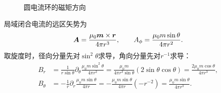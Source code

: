 \begin{figure}[H]\centering
{}
\caption{圆电流环的磁矩方向}\label{fig:es4-h10-q}
\end{figure}
\begin{solution}
局域闭合电流的远区矢势为
\[\bm{A}=\frac{\mu_0\bm{m}\times\bm{r}}{4\pi r^3},\qquad A_\phi=\frac{\mu_0m\sin\theta}{4\pi r^2}.\]
取旋度时，径向分量先对$\sin^2\theta$求导，角向分量先对$r^{-1}$求导：
\[\begin{aligned}
B_r&=\frac1{r\sin\theta}\partial_\theta\frac{\mu_0m\sin^2\theta}{4\pi r^2}
=\frac{\mu_0m}{4\pi r^3\sin\theta}(2\sin\theta\cos\theta)
=\frac{2\mu_0m\cos\theta}{4\pi r^3},\\
B_\theta&=-\frac1r\partial_r\frac{\mu_0m\sin\theta}{4\pi r}
=-\frac{\mu_0m\sin\theta}{4\pi r}(-r^{-2})
=\frac{\mu_0m\sin\theta}{4\pi r^3}.
\end{aligned}\]


\end{solution}
